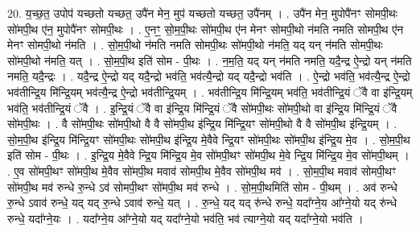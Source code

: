 \documentclass[17pt]{extarticle}
\begin{document}
20. य॒च्छ॒त॒ उपोप॑ यच्छतो यच्छत॒ उपै॑न मेन॒ मुप॑ यच्छतो यच्छत॒ उपै॑नम् । . उपै॑न मेन॒ मुपोपै॑नꣳ सोमपी॒थः सो॑मपी॒थ ए॑न॒ मुपोपै॑नꣳ सोमपी॒थः । . ए॒नꣳ॒॒ सो॒म॒पी॒थः सो॑मपी॒थ ए॑न मेनꣳ सोमपी॒थो न॑मति नमति सोमपी॒थ ए॑न मेनꣳ सोमपी॒थो न॑मति । . सो॒म॒पी॒थो न॑मति नमति सोमपी॒थः सो॑मपी॒थो न॑मति॒ यद् यन् न॑मति सोमपी॒थः सो॑मपी॒थो न॑मति॒ यत् । . सो॒म॒पी॒थ इति॑ सोम - पी॒थः । . न॒म॒ति॒ यद् यन् न॑मति नमति॒ यदै॒न्द्र ऐ॒न्द्रो यन् न॑मति नमति॒ यदै॒न्द्रः । . यदै॒न्द्र ऐ॒न्द्रो यद् यदै॒न्द्रो भव॑ति॒ भव॑त्यै॒न्द्रो यद् यदै॒न्द्रो भव॑ति । . ऐ॒न्द्रो भव॑ति॒ भव॑त्यै॒न्द्र ऐ॒न्द्रो भव॑तीन्द्रि॒य मि॑न्द्रि॒यम् भव॑त्यै॒न्द्र ऐ॒न्द्रो भव॑तीन्द्रि॒यम् । . भव॑तीन्द्रि॒य मि॑न्द्रि॒यम् भव॑ति॒ भव॑तीन्द्रि॒यं ॅवै वा इ॑न्द्रि॒यम् भव॑ति॒ भव॑तीन्द्रि॒यं ॅवै । . इ॒न्द्रि॒यं ॅवै वा इ॑न्द्रि॒य मि॑न्द्रि॒यं ॅवै सो॑मपी॒थः सो॑मपी॒थो वा इ॑न्द्रि॒य मि॑न्द्रि॒यं ॅवै सो॑मपी॒थः । . वै सो॑मपी॒थः सो॑मपी॒थो वै वै सो॑मपी॒थ इ॑न्द्रि॒य मि॑न्द्रि॒यꣳ सो॑मपी॒थो वै वै सो॑मपी॒थ इ॑न्द्रि॒यम् । . सो॒म॒पी॒थ इ॑न्द्रि॒य मि॑न्द्रि॒यꣳ सो॑मपी॒थः सो॑मपी॒थ इ॑न्द्रि॒य मे॒वैवे न्द्रि॒यꣳ सो॑मपी॒थः सो॑मपी॒थ इ॑न्द्रि॒य मे॒व । . सो॒म॒पी॒थ इति॑ सोम - पी॒थः । . इ॒न्द्रि॒य मे॒वैवे न्द्रि॒य मि॑न्द्रि॒य मे॒व सो॑मपी॒थꣳ सो॑मपी॒थ मे॒वे न्द्रि॒य मि॑न्द्रि॒य मे॒व सो॑मपी॒थम् । . ए॒व सो॑मपी॒थꣳ सो॑मपी॒थ मे॒वैव सो॑मपी॒थ मवाव॑ सोमपी॒थ मे॒वैव सो॑मपी॒थ मव॑ । . सो॒म॒पी॒थ मवाव॑ सोमपी॒थꣳ सो॑मपी॒थ मव॑ रुन्धे रु॒न्धे ऽव॑ सोमपी॒थꣳ सो॑मपी॒थ मव॑ रुन्धे । . सो॒म॒पी॒थमिति॑ सोम - पी॒थम् । . अव॑ रुन्धे रु॒न्धे ऽवाव॑ रुन्धे॒ यद् यद् रु॒न्धे ऽवाव॑ रुन्धे॒ यत् । . रु॒न्धे॒ यद् यद् रु॑न्धे रुन्धे॒ यदा᳚ग्ने॒य आ᳚ग्ने॒यो यद् रु॑न्धे रुन्धे॒ यदा᳚ग्ने॒यः । . यदा᳚ग्ने॒य आ᳚ग्ने॒यो यद् यदा᳚ग्ने॒यो भव॑ति॒ भव॑ त्याग्ने॒यो यद् यदा᳚ग्ने॒यो भव॑ति । \newline
\end{document}
